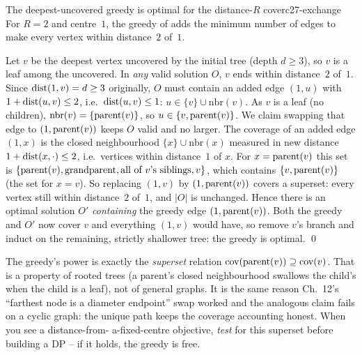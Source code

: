 \begin{theorem}{The deepest-uncovered greedy is optimal for the distance-$R$ cover}{c27-exchange}
For $R = 2$ and centre~$1$, the greedy of  adds the minimum
number of edges to make every vertex within distance~$2$ of~$1$.
\end{theorem}
\begin{proofbox}
Let $v$ be the deepest vertex uncovered by the initial tree (depth $d \ge 3$), so
$v$ is a leaf among the uncovered. In \emph{any} valid solution $O$, $v$ ends within
distance~$2$ of~$1$. Since $\operatorname{dist}(1,v) = d \ge 3$ originally, $O$ must contain an
added edge $(1,u)$ with $1 + \operatorname{dist}(u,v) \le 2$, i.e.\ $\operatorname{dist}(u,v) \le 1$: $u \in
\{v\} \cup \mathrm{nbr}(v)$. As $v$ is a leaf (no children), $\mathrm{nbr}(v) = \{\operatorname{parent}(v)\}$,
so $u \in \{v, \operatorname{parent}(v)\}$. We claim swapping that edge to $(1,\operatorname{parent}(v))$ keeps
$O$ valid and no larger. The coverage of an added edge $(1,x)$ is the closed
neighbourhood $\{x\} \cup \mathrm{nbr}(x)$ measured in new distance $1 + \operatorname{dist}(x,\cdot)
\le 2$, i.e.\ vertices within distance~$1$ of $x$. For $x = \operatorname{parent}(v)$ this set is
$\{\operatorname{parent}(v), \text{grandparent}, \text{all of } v\text{'s siblings}, v\}$,
which contains $\{v, \operatorname{parent}(v)\}$ (the set for $x = v$). So replacing $(1,v)$ by
$(1,\operatorname{parent}(v))$ covers a superset: every vertex still within distance~$2$ of~$1$,
and $|O|$ is unchanged. Hence there is an optimal solution $O'$ \emph{containing}
the greedy edge $(1,\operatorname{parent}(v))$. Both the greedy and $O'$ now cover $v$ and
everything $(1,v)$ would have, so remove $v$'s branch and induct on the remaining,
strictly shallower tree: the greedy is optimal. \qed
\end{proofbox}

\begin{insightbox}
The greedy's power is exactly the \emph{superset} relation
$\mathrm{cov}(\operatorname{parent}(v)) \supseteq \mathrm{cov}(v)$. That is a property of rooted
trees (a parent's closed neighbourhood swallows the child's when the child is a
leaf), not of general graphs. It is the same reason Ch.~12's ``farthest node is a
diameter endpoint'' swap worked and the analogous claim fails on a cyclic graph:
the unique path keeps the coverage accounting honest. When you see a distance-from-
a-fixed-centre objective, \emph{test} for this superset before building a DP -- if
it holds, the greedy is free.
\end{insightbox}

